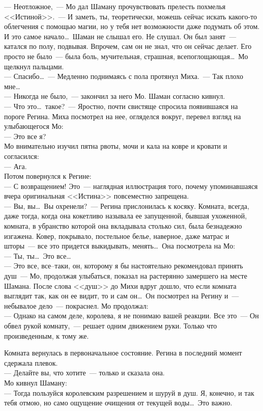 --- Неотложное,~--- Мо дал Шаману прочувствовать прелесть похмелья 
<<Истиной>>.~--- И заметь, ты, теоретически, можешь сейчас искать какого-то облегчения с помощью 
магии, но у тебя нет возможности даже подумать об этом. И это самое 
начало\ldots\ Шаман не слышал его. Не слушал. Он был занят~--- катался по полу, подвывая. 
Впрочем, сам он не знал, что он сейчас делает. Его просто не было~--- была 
боль, мучительная, страшная, всепоглощающая\ldots\ Мо щелкнул пальцами.\\
--- Спасибо\ldots~--- Медленно поднимаясь с пола протянул Миха.~--- Так плохо 
мне\ldots\\
--- Никогда не было,~--- закончил за него Мо. Шаман согласно кивнул. \\
--- Что это\ldots\ такое?~--- Яростно, почти свистяще спросила появившаяся на 
пороге Регина. Миха посмотрел на нее, огляделся вокруг, перевел взгляд на улыбающегося 
Мо:\\
--- Это все я?\\
Мо внимательно изучил пятна рвоты, мочи и кала на ковре и кровати и согласился:\\
--- Ага.\\
Потом повернулся к Регине:\\
--- С возвращением! Это~--- наглядная иллюстрация того, почему упоминавшаяся 
вчера оригинальная <<Истина>> повсеместно запрещена.\\
--- Вы, вы\ldots\ Вы охренели?~--- Регина прислонилась к косяку. Комната, всегда, 
даже тогда, когда она кокетливо называла ее запущенной, бывшая ухоженной, комната, в 
убранство которой она вкладывала столько сил, была безнадежно изгажена. Ковер, 
покрывало, постельное белье, наверное, даже матрас и шторы~--- все это придется 
выкидывать, менять\ldots\ Она посмотрела на Мо:\\
--- Ты, ты\ldots\ Это все\ldots\\
--- Это все, все--таки, он, которому я бы настоятельно рекомендовал принять 
душ~--- Мо, продолжая улыбаться, показал на растерянно замершего на месте Шамана. После 
слова <<душ>> до Михи вдруг дошло, что если комната выглядит так, как он ее 
видит, то и сам он\ldots\ Он посмотрел на Регину и~--- небывалое дело~--- покраснел. 
Мо продолжал:\\
--- Однако на самом деле, королева, я не понимаю вашей реакции. Все это~--- Он 
обвел рукой комнату,~--- решает одним движением руки. Только что произведенным, к 
тому же.

Комната вернулась в первоначальное состояние. Регина в последний момент 
сдержала плевок.\\
--- Делайте вы, что хотите~--- только и сказала она.\\
Мо кивнул Шаману:\\
--- Тогда пользуйся королевским разрешением и шуруй в душ. Я, конечно, и так тебя 
отмою, но само ощущение очищения от текущей воды\ldots\ Это важно.

